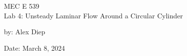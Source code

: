 \documentclass[letterpaper,12pt]{article}
\begin{document}
\begin{titlepage}
    \centering
    \vspace*{2cm} %
    
    \Huge {MEC E 539 \\Lab 4: Unsteady Laminar Flow Around a Circular Cylinder} \\
    \vspace{1cm} %
    
    \Large by: Alex Diep \\
    \vspace{1cm} %

    \Large Date: March 8, 2024 \\ %
    \vspace{2cm} %
\end{titlepage}

{
    \hypersetup{hidelinks}
    \tableofcontents
}
\newpage
{
    \hypersetup{linkcolor=black}
    \listoffigures
    \listoftables
}
\newpage
{}



\newpage


\end{document}
